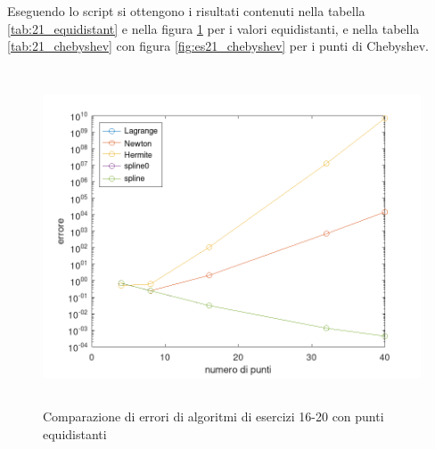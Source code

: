 Eseguendo lo script  si ottengono i risultati contenuti nella
tabella \ref{tab:21_equidistant} e nella figura \ref{fig:es21_equidistant} per
i valori equidistanti, e nella tabella \ref{tab:21_chebyshev} con figura
\ref{fig:es21_chebyshev} per i punti di Chebyshev.
\begin{figure}[!ht]
    \centering
    \includegraphics[width=16cm,height=10cm,keepaspectratio]{capitolo4/es21_figure_equidistant.png}
    \caption{Comparazione di errori di algoritmi di esercizi 16-20 con punti equidistanti}
    \label{fig:es21_equidistant}
\end{figure}
\FloatBarrier

